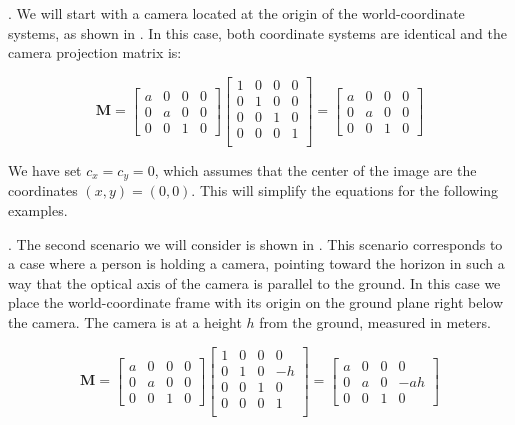 . We will start with a camera located at the origin of the world-coordinate systems, as shown in . In this case, both coordinate systems are identical and the camera projection matrix is:

\begin{equation}
    \mathbf{M} 
    =             
    \begin{bmatrix}
    a & 0 & 0 & 0 \\
    0 & a & 0 & 0 \\
    0 & 0 & 1 & 0
    \end{bmatrix}
    \begin{bmatrix}
    1 & 0 & 0 & 0 \\
    0 & 1 & 0 & 0 \\
    0 & 0 & 1 & 0 \\
    0 & 0 & 0 & 1 \\
    \end{bmatrix}
    =
    \begin{bmatrix}
    a & 0 & 0 & 0 \\
    0 & a & 0 & 0 \\
    0 & 0 & 1 & 0
    \end{bmatrix}
    \label{eq:model1}
\end{equation}

We have set $c_x=c_y=0$, which assumes that the center of the image are the coordinates $(x,y)=(0,0)$. This will simplify the equations for the following examples. 


. The second scenario we will consider is shown in . This scenario corresponds to a case where a person is holding a camera, pointing toward the horizon in such a way that the optical axis of the camera is parallel to the ground. In this case we place the world-coordinate frame with its origin on the ground plane right below the camera. The camera is at a height $h$ from the ground, measured in meters. 


\begin{equation}
    \mathbf{M} 
    =             
    \begin{bmatrix}
    a & 0 & 0 & 0 \\
    0 & a & 0 & 0 \\
    0 & 0 & 1 & 0
    \end{bmatrix}
    \begin{bmatrix}
    1 & 0 & 0 & 0 \\
    0 & 1 & 0 & -h \\
    0 & 0 & 1 & 0 \\
    0 & 0 & 0 & 1 \\
    \end{bmatrix}
    =
    \begin{bmatrix}
    a & 0 & 0 & 0 \\
    0 & a & 0 & -ah \\
    0 & 0 & 1 & 0
    \end{bmatrix}
    \label{eq:model2}
\end{equation}

